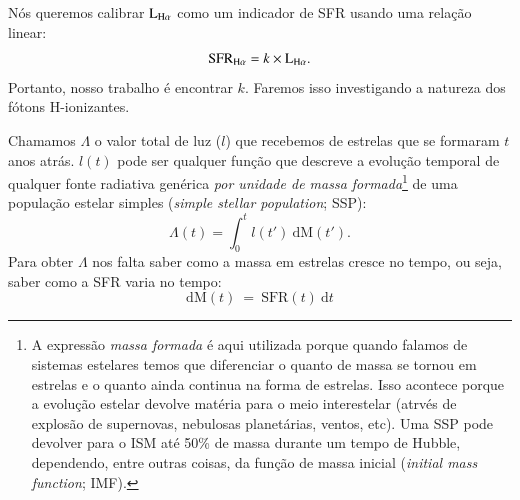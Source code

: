 Nós queremos calibrar $\LHalpha$ como um indicador de SFR usando uma relação linear:
\begin{equation}
	\mathrm{SFR}_{\Ha} = k \times \LHalpha.
	\label{eq:SFRHa}
\end{equation}
\noindent Portanto, nosso trabalho é encontrar $k$. Faremos isso investigando a natureza dos
fótons H-ionizantes.

Chamamos $\Lambda$ o valor total de luz ($l$) que recebemos de estrelas que se formaram $t$ anos atrás. $l(t)$ pode ser qualquer função que descreve a evolução temporal de qualquer fonte radiativa genérica \emph{por unidade de massa formada}\footnote{A expressão {\em massa formada} é aqui utilizada porque quando falamos de sistemas estelares temos que diferenciar o quanto de massa se tornou em estrelas e o quanto ainda continua na forma de estrelas. Isso acontece porque a evolução estelar devolve matéria para o meio interestelar (atrvés de explosão de supernovas, nebulosas planetárias, ventos, etc). Uma SSP pode devolver para o ISM até 50\% de massa durante um tempo de Hubble, dependendo, entre outras coisas, da função de massa inicial ({\em initial mass function}; IMF).} de uma população estelar simples ({\em simple stellar population}; SSP):
\begin{equation}
	\Lambda(t) = \int_0^t l(t')\ \textrm{d}\textrm{M}(t').
	\label{eq:dLambda}
\end{equation}
\noindent Para obter $\Lambda$ nos falta saber como a massa em estrelas cresce no tempo, ou seja, saber como a SFR varia no tempo:
\begin{equation}
	\mathrm{d}\mathrm{M}(t)\ =\ \mathrm{SFR}(t)\ \mathrm{d}t
	\label{eq:dM_t}
\end{equation}

